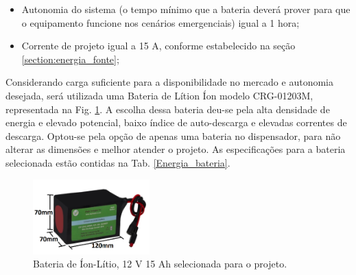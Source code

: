 \begin{itemize}
    \item Autonomia do sistema (o tempo mínimo que a bateria deverá prover para que o equipamento funcione nos cenários emergenciais) igual a 1 hora;
    \item Corrente de projeto igual a 15 A, conforme estabelecido na seção \ref{section:energia_fonte};
\end{itemize}


Considerando carga suficiente para a disponibilidade no mercado e autonomia desejada, será utilizada uma Bateria de Lítion Íon modelo CRG-01203M, representada na Fig. \ref{fig:energia_bateria}. A escolha dessa bateria deu-se pela alta densidade de energia e elevado potencial, baixo índice de auto-descarga e elevadas correntes de descarga. Optou-se pela opção de apenas uma bateria no dispensador, para não alterar as dimensões e melhor atender o projeto. As especificações para a bateria selecionada estão contidas na Tab. \ref{Energia_bateria}.

\begin{figure}[H]
\centering
    \includegraphics[width=0.4\textwidth]{figuras/energia/fotos_componentes/bateria.png}
    \caption{Bateria de Íon-Lítio, 12 V 15 Ah selecionada para o projeto.}
    \label{fig:energia_bateria}
\end{figure}


